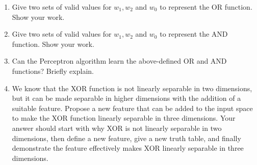 \documentclass[11pt]{article}
\begin{document}
    \begin{enumerate}[(1)]
        \item Give two sets of valid values for $w_1, w_2$ and $w_0$ to represent the OR function. Show your work.
        \begin{answertext}{6cm}{}

        \end{answertext}

        \item Give two sets of valid values for $w_1, w_2$ and $w_0$ to represent the AND function. Show your work.
        
        \begin{answertext}{6cm}{}

        \end{answertext}


        \item Can the Perceptron algorithm learn the above-defined OR and AND functions? Briefly explain.
        
        \begin{answertext}{2cm}{}

        \end{answertext}
        
        \item We know that the XOR function is not linearly separable in two dimensions, but it can be made separable in higher dimensions with the addition of a suitable feature. Propose a new feature that can be added to the input space to make the XOR function linearly separable in three dimensions. Your answer should start with why XOR is not linearly separable in two dimensions, then define a new feature, give a new truth table, and finally demonstrate the feature effectively makes XOR linearly separable in three dimensions.

        \begin{answertext}{13cm}{}

        \end{answertext}

        
    \end{enumerate}
\pagebreak
\end{document}
